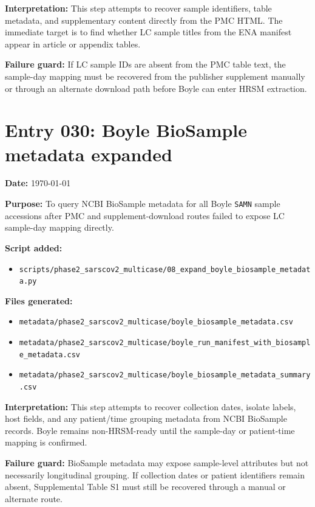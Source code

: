 \textbf{Interpretation:} This step attempts to recover sample identifiers, table metadata, and supplementary content directly from the PMC HTML. The immediate target is to find whether LC sample titles from the ENA manifest appear in article or appendix tables.

\textbf{Failure guard:} If LC sample IDs are absent from the PMC table text, the sample-day mapping must be recovered from the publisher supplement manually or through an alternate download path before Boyle can enter HRSM extraction.

\section*{Entry 030: Boyle BioSample metadata expanded}

\textbf{Date:} \today

\textbf{Purpose:} To query NCBI BioSample metadata for all Boyle \texttt{SAMN} sample accessions after PMC and supplement-download routes failed to expose LC sample-day mapping directly.

\textbf{Script added:}
\begin{itemize}
    \item \texttt{scripts/phase2\_sarscov2\_multicase/08\_expand\_boyle\_biosample\_metadata.py}
\end{itemize}

\textbf{Files generated:}
\begin{itemize}
    \item \texttt{metadata/phase2\_sarscov2\_multicase/boyle\_biosample\_metadata.csv}
    \item \texttt{metadata/phase2\_sarscov2\_multicase/boyle\_run\_manifest\_with\_biosample\_metadata.csv}
    \item \texttt{metadata/phase2\_sarscov2\_multicase/boyle\_biosample\_metadata\_summary.csv}
\end{itemize}

\textbf{Interpretation:} This step attempts to recover collection dates, isolate labels, host fields, and any patient/time grouping metadata from NCBI BioSample records. Boyle remains non-HRSM-ready until the sample-day or patient-time mapping is confirmed.

\textbf{Failure guard:} BioSample metadata may expose sample-level attributes but not necessarily longitudinal grouping. If collection dates or patient identifiers remain absent, Supplemental Table S1 must still be recovered through a manual or alternate route.


